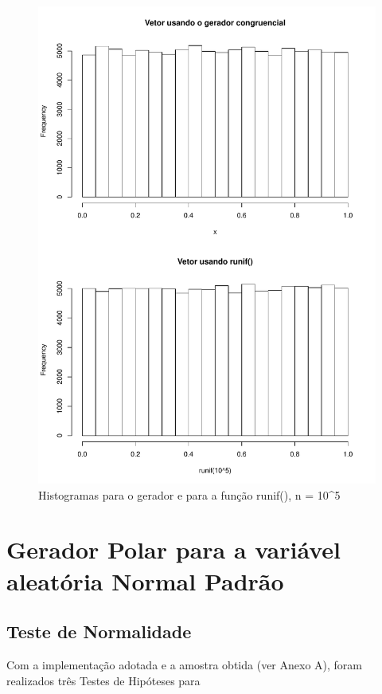 \documentclass[
	article,			%
	12pt,				%
	twoside,			%
	a4paper,			%
	english,			%
	brazil,				%
	]{abntex2}
\begin{document}
    \begin{figure}[h]
        \centering
        \includegraphics[scale=0.24]{hist_runif_congruencial}
        \caption{Histogramas para o gerador e para a função runif(), n = 10^5}
        \label{fig:hist_runif}
    \end{figure}
    
\section{Gerador Polar para a variável aleatória Normal Padrão}
\subsection{Teste de Normalidade}\label{metodo:rnorm_polar}
    Com a implementação adotada e a amostra obtida (ver Anexo A), foram realizados três Testes de Hipóteses para 
        
\end{document}
